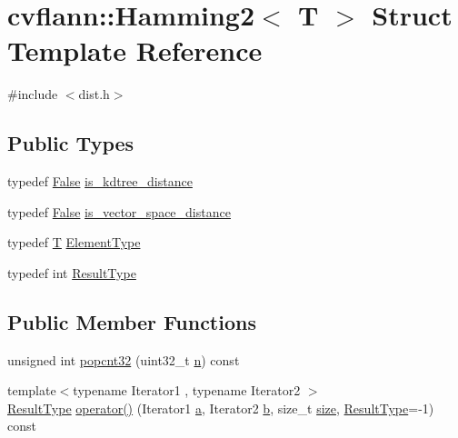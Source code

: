 \hypertarget{structcvflann_1_1Hamming2}{\section{cvflann\-:\-:Hamming2$<$ T $>$ Struct Template Reference}
\label{structcvflann_1_1Hamming2}
}


{\ttfamily \#include $<$dist.\-h$>$}

\subsection*{Public Types}
\begin{DoxyCompactItemize}
\item 
typedef \hyperlink{classcvflann_1_1False}{False} \hyperlink{structcvflann_1_1Hamming2_a8e207493c0cb89f608de61095186e58a}{is\-\_\-kdtree\-\_\-distance}
\item 
typedef \hyperlink{classcvflann_1_1False}{False} \hyperlink{structcvflann_1_1Hamming2_a7572b1466e814fee469fef9b279ce9e5}{is\-\_\-vector\-\_\-space\-\_\-distance}
\item 
typedef \hyperlink{calib3d_8hpp_a3efb9551a871ddd0463079a808916717}{T} \hyperlink{structcvflann_1_1Hamming2_a334d2a82d1094c80367ae6e8defd3561}{Element\-Type}
\item 
typedef int \hyperlink{structcvflann_1_1Hamming2_a06581206d8fcf7b0282ea2813cb9f732}{Result\-Type}
\end{DoxyCompactItemize}
\subsection*{Public Member Functions}
\begin{DoxyCompactItemize}
\item 
unsigned int \hyperlink{structcvflann_1_1Hamming2_a6c4830cc73eb8cfa0bcbe0c244456c44}{popcnt32} (uint32\-\_\-t \hyperlink{legacy_8hpp_a76f11d9a0a47b94f72c2d0e77fb32240}{n}) const 
\item 
{\footnotesize template$<$typename Iterator1 , typename Iterator2 $>$ }\\\hyperlink{structcvflann_1_1Hamming2_a06581206d8fcf7b0282ea2813cb9f732}{Result\-Type} \hyperlink{structcvflann_1_1Hamming2_a482334eccf3e932333f30a7e7383639e}{operator()} (Iterator1 \hyperlink{legacy_8hpp_a1031d0e0a97a340abfe0a6ab9e831045}{a}, Iterator2 \hyperlink{legacy_8hpp_ac04272e8ca865b8fba18d36edae9fd2a}{b}, size\-\_\-t \hyperlink{legacy_8hpp_ae97003f8d5c64cdfb99f6f2606d121b6}{size}, \hyperlink{structcvflann_1_1Hamming2_a06581206d8fcf7b0282ea2813cb9f732}{Result\-Type}=-\/1) const 
\end{DoxyCompactItemize}


